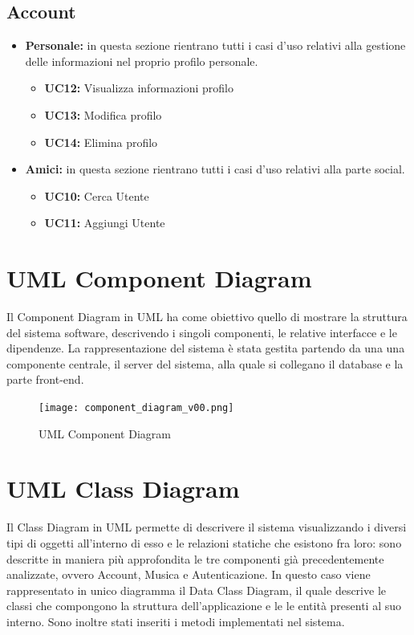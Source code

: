 \subsection{Account}
\begin{itemize}
    \item \textbf{Personale:} in questa sezione rientrano tutti i casi d'uso relativi alla gestione delle informazioni nel proprio profilo personale.
    \begin{itemize}
        \item \textbf{UC12:} Visualizza informazioni profilo 
        \item \textbf{UC13:} Modifica profilo 
        \item \textbf{UC14:} Elimina profilo 
    \end{itemize}
    
    \item \textbf{Amici:} in questa sezione rientrano tutti i casi d'uso relativi alla parte social.
    \begin{itemize}
        \item \textbf{UC10:} Cerca Utente 
        \item \textbf{UC11:} Aggiungi Utente 
    \end{itemize}
\end{itemize}




\newpage
\section{UML Component Diagram}
Il Component Diagram in UML ha come obiettivo quello di mostrare la struttura
del sistema software, descrivendo i singoli componenti, le relative interfacce 
e le dipendenze. 
La rappresentazione del sistema è stata gestita partendo da una
una componente centrale, il server del sistema, alla quale si collegano il database e la parte front-end.


\begin{figure}[H]
    \centering
    \texttt{[image: component\_diagram\_v00.png]}
    \caption{UML Component Diagram}
    \label{fig-uml-component-diag}
\end{figure}





\newpage

\section{UML Class Diagram}
Il Class Diagram in UML permette di descrivere il sistema 
visualizzando i diversi tipi di oggetti all'interno di esso e le relazioni 
statiche che esistono fra loro: sono descritte in maniera più approfondita 
le tre componenti già precedentemente analizzate, ovvero Account, Musica e 
Autenticazione.
In questo caso viene rappresentato in unico diagramma il Data Class Diagram, 
il quale descrive le classi che compongono la struttura dell'applicazione e le
le entità presenti al suo interno. Sono inoltre stati inseriti i metodi implementati
nel sistema.

